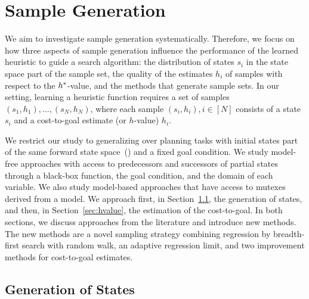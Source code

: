 \chapter{Sample Generation}
\label{sec:sampling}

We aim to investigate sample generation systematically. Therefore, we focus on how three aspects of sample generation influence the performance of the learned heuristic to guide a search algorithm: the distribution of states $s_i$ in the state space part of the sample set, the quality of the estimates $h_i$ of samples with respect to the $h^{*}$-value, and the methods that generate sample sets. In our setting, learning a heuristic function requires a set of samples $(s_1,h_1),\ldots,(s_N,h_N)$, where each sample $(s_i,h_i), i\in[N]$ consists of a state $s_i$ and a cost-to-goal estimate (or $h$-value) $h_i$.

We restrict our study to generalizing over planning tasks with initial states part of the same forward state space~(\fssp) and a fixed goal condition. We study model-free approaches with access to predecessors and successors of partial states through a black-box function, the goal condition, and the domain of each variable. We also study model-based approaches that have access to mutexes derived from a \sas model. We approach first, in Section~\ref{sec:generation}, the generation of states, and then, in Section~\ref{sec:hvalue}, the estimation of the cost-to-goal. In both sections, we discuss approaches from the literature and introduce new methods. The new methods are a novel sampling strategy combining regression by breadth-first search with random walk, an adaptive regression limit, and two improvement methods for cost-to-goal estimates.

\section{Generation of States}
\label{sec:generation}

